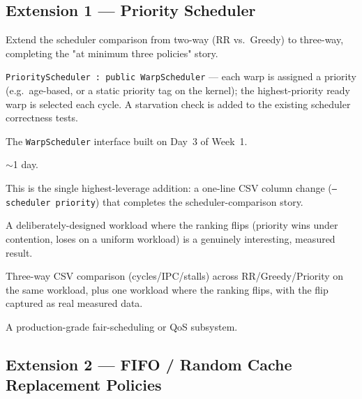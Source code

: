 \documentclass[11pt]{article}
\begin{document}
\subsection{Extension 1 --- Priority Scheduler}

\begin{description}[leftmargin=1.2cm]
  \item[Purpose] Extend the scheduler comparison from two-way (RR vs.\
  Greedy) to three-way, completing the "at minimum three policies" story.
  \item[Implementation] \texttt{PriorityScheduler : public WarpScheduler}
  --- each warp is assigned a priority (e.g.\ age-based, or a static
  priority tag on the kernel); the highest-priority ready warp is selected
  each cycle. A starvation check is added to the existing scheduler
  correctness tests.
  \item[Dependencies] The \texttt{WarpScheduler} interface built on Day~3
  of Week~1.
  \item[Estimated effort] $\sim$1 day.
  \item[Design notes] This is the single highest-leverage addition: a
  one-line CSV column change (\texttt{--scheduler priority}) that
  completes the scheduler-comparison story.
  \item[Why it matters] A deliberately-designed workload where the
  ranking flips (priority wins under contention, loses on a uniform
  workload) is a genuinely interesting, measured result.
  \item[Proof of done] Three-way CSV comparison (cycles/IPC/stalls) across
  RR/Greedy/Priority on the same workload, plus one workload where the
  ranking flips, with the flip captured as real measured data.
  \item[Does not claim] A production-grade fair-scheduling or QoS
  subsystem.
\end{description}

\subsection{Extension 2 --- FIFO / Random Cache Replacement Policies}
\end{document}
